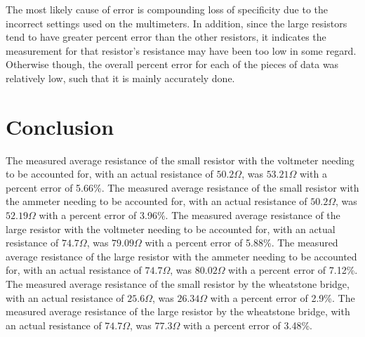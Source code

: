 \documentclass[11pt, titlepage]{article}
\begin{document}
The most likely cause of error is compounding loss of specificity due to the incorrect settings used on the multimeters. In addition, since the large resistors tend to have greater percent error than the other resistors, it indicates the measurement for that resistor's resistance may have been too low in some regard. Otherwise though, the overall percent error for each of the pieces of data was relatively low, such that it is mainly accurately done.

\section*{Conclusion}

The measured average resistance of the small resistor with the voltmeter needing to be accounted for, with an actual resistance of $50.2 \Omega$, was $53.21 \Omega$ with a percent error of 5.66\%. The measured average resistance of the small resistor with the ammeter needing to be accounted for, with an actual resistance of $50.2 \Omega$, was $52.19 \Omega$ with a percent error of 3.96\%. The measured average resistance of the large resistor with the voltmeter needing to be accounted for, with an actual resistance of $74.7 \Omega$, was $79.09 \Omega$ with a percent error of 5.88\%. The measured average resistance of the large resistor with the ammeter needing to be accounted for, with an actual resistance of $74.7 \Omega$, was $80.02 \Omega$ with a percent error of 7.12\%. The measured average resistance of the small resistor by the wheatstone bridge, with an actual resistance of $25.6 \Omega$, was $26.34 \Omega$ with a percent error of 2.9\%. The measured average resistance of the large resistor by the wheatstone bridge, with an actual resistance of $74.7 \Omega$, was $77.3 \Omega$ with a percent error of 3.48\%.
\end{document}
